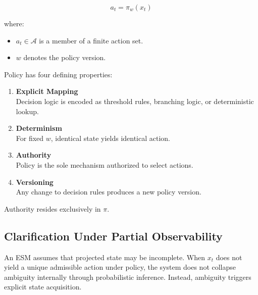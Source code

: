 \documentclass[11pt]{article}
\begin{document}
\[
a_t = \pi_w(x_t)
\]

where:

\begin{itemize}
  \item $a_t \in \mathcal{A}$ is a member of a finite action set.
  \item $w$ denotes the policy version.
\end{itemize}

Policy has four defining properties:

\begin{enumerate}
  \item \textbf{Explicit Mapping} \\
  Decision logic is encoded as threshold rules, branching logic, or deterministic lookup.

  \item \textbf{Determinism} \\
  For fixed $w$, identical state yields identical action.

  \item \textbf{Authority} \\
  Policy is the sole mechanism authorized to select actions.

  \item \textbf{Versioning} \\
  Any change to decision rules produces a new policy version.
\end{enumerate}

Authority resides exclusively in $\pi$.


\subsection{Clarification Under Partial Observability}

An ESM assumes that projected state may be incomplete. When $x_t$ does not yield a unique admissible action under policy, the system does not collapse ambiguity internally through probabilistic inference. Instead, ambiguity triggers explicit state acquisition.
\end{document}

